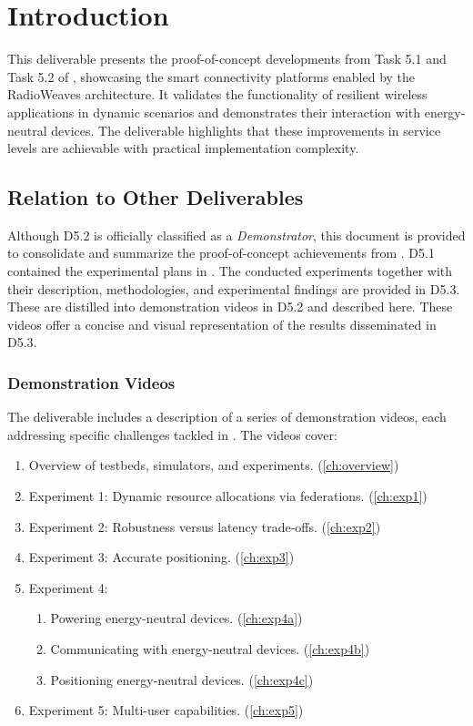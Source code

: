 


\chapter{Introduction}\label{ch:introduction}

This deliverable presents the proof-of-concept developments from Task 5.1 and Task 5.2 of \projectname, showcasing the smart connectivity platforms enabled by the RadioWeaves architecture. It validates the functionality of resilient wireless applications in dynamic scenarios and demonstrates their interaction with energy-neutral devices. The deliverable highlights that these improvements in service levels are achievable with practical implementation complexity.

\section*{Relation to Other Deliverables}
Although D5.2 is officially classified as a \emph{Demonstrator}, this document is provided to consolidate and summarize the proof-of-concept achievements from \projectname. D5.1 contained the experimental plans in \projectname. The conducted experiments together with their description, methodologies, and experimental findings are provided in D5.3. These are distilled into demonstration videos in D5.2 and described here. These videos offer a concise and visual representation of the results disseminated in D5.3.

\subsection*{Demonstration Videos}
The deliverable includes a description of a series of demonstration videos, each addressing specific challenges tackled in \projectname. The videos cover:
\begin{enumerate}
    \item Overview of testbeds, simulators, and experiments. (\cref{ch:overview})
    \item Experiment 1: Dynamic resource allocations via federations. (\cref{ch:exp1})
    \item Experiment 2: Robustness versus latency trade-offs. (\cref{ch:exp2})
    \item Experiment 3: Accurate positioning. (\cref{ch:exp3})
    \item Experiment 4:
    \begin{enumerate}[label=\alph*)]
        \item Powering energy-neutral devices. (\cref{ch:exp4a})
        \item Communicating with energy-neutral devices. (\cref{ch:exp4b})
        \item Positioning energy-neutral devices. (\cref{ch:exp4c})
    \end{enumerate}
    \item Experiment 5: Multi-user capabilities. (\cref{ch:exp5})
\end{enumerate}

